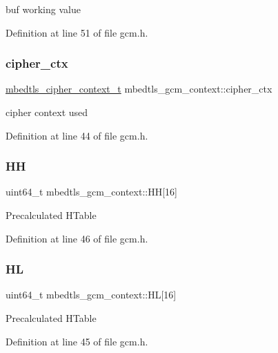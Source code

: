 buf working value 

Definition at line 51 of file gcm.\+h.

\mbox{\label{structmbedtls__gcm__context_a3687a336bb05c025fb3861ca99cd945d}} 
\subsubsection{\texorpdfstring{cipher\+\_\+ctx}{cipher\_ctx}}
{\footnotesize\ttfamily \mbox{\hyperlink{structmbedtls__cipher__context__t}{mbedtls\+\_\+cipher\+\_\+context\+\_\+t}} mbedtls\+\_\+gcm\+\_\+context\+::cipher\+\_\+ctx}

cipher context used 

Definition at line 44 of file gcm.\+h.

\mbox{\label{structmbedtls__gcm__context_a5935337c8028cc6fec0c5b9c7d0d4fd8}} 
\subsubsection{\texorpdfstring{HH}{HH}}
{\footnotesize\ttfamily uint64\+\_\+t mbedtls\+\_\+gcm\+\_\+context\+::\+HH\mbox{[}16\mbox{]}}

Precalculated H\+Table 

Definition at line 46 of file gcm.\+h.

\mbox{\label{structmbedtls__gcm__context_af5731ab9002f0b1b913e66071e1138fc}} 
\subsubsection{\texorpdfstring{HL}{HL}}
{\footnotesize\ttfamily uint64\+\_\+t mbedtls\+\_\+gcm\+\_\+context\+::\+HL\mbox{[}16\mbox{]}}

Precalculated H\+Table 

Definition at line 45 of file gcm.\+h.


